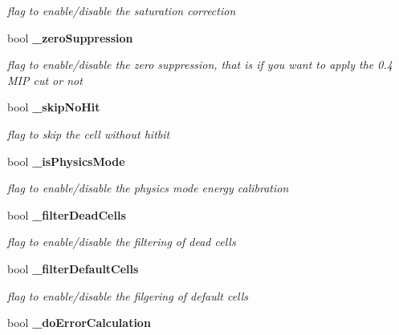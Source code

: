 \begin{DoxyCompactItemize}
\begin{DoxyCompactList}\small\item\em flag to enable/disable the saturation correction \item\end{DoxyCompactList}\item 
bool {\bf \_\-zeroSuppression}\label{classCALICE_1_1Ahc2CalibrateProcessor_a6498f3913e1c29ca1903001108e5fc23}

\begin{DoxyCompactList}\small\item\em flag to enable/disable the zero suppression, that is if you want to apply the 0.4 MIP cut or not \item\end{DoxyCompactList}\item 
bool {\bf \_\-skipNoHit}\label{classCALICE_1_1Ahc2CalibrateProcessor_aa44da590aa3e13e6f4645608d6688503}

\begin{DoxyCompactList}\small\item\em flag to skip the cell without hitbit \item\end{DoxyCompactList}\item 
bool {\bf \_\-isPhysicsMode}\label{classCALICE_1_1Ahc2CalibrateProcessor_a2d753d78ae5426ff61005e48040ad22c}

\begin{DoxyCompactList}\small\item\em flag to enable/disable the physics mode energy calibration \item\end{DoxyCompactList}\item 
bool {\bf \_\-filterDeadCells}\label{classCALICE_1_1Ahc2CalibrateProcessor_af1da32722c145038b42b025b34d451e9}

\begin{DoxyCompactList}\small\item\em flag to enable/disable the filtering of dead cells \item\end{DoxyCompactList}\item 
bool {\bf \_\-filterDefaultCells}\label{classCALICE_1_1Ahc2CalibrateProcessor_afd38d20f0310d2ce016d80493a25c651}

\begin{DoxyCompactList}\small\item\em flag to enable/disable the filgering of default cells \item\end{DoxyCompactList}\item 
bool {\bf \_\-doErrorCalculation}\label{classCALICE_1_1Ahc2CalibrateProcessor_a14fc5b04c571329bde618c70e5aa9885}


\end{DoxyCompactItemize}
